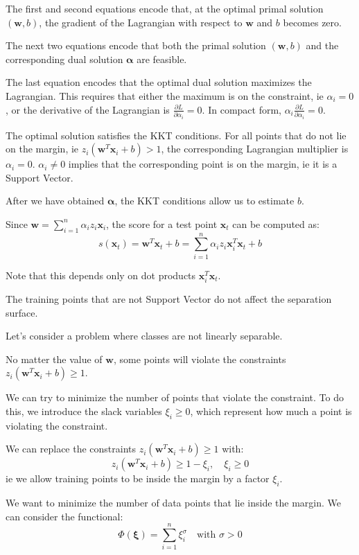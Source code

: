 The first and second equations encode that, at the optimal primal solution $(\mathbf{w}, b)$, the
gradient of the Lagrangian with respect to $\mathbf{w}$ and $b$ becomes zero.

The next two equations encode that both the primal solution $(\mathbf{w}, b)$ and the corresponding
dual solution $\boldsymbol{\alpha}$ are feasible.

The last equation encodes that the optimal dual solution maximizes the Lagrangian. This
requires that either the maximum is on the constraint, ie $\alpha_i = 0$, or the derivative of the
Lagrangian is $\frac{\partial L}{\partial \alpha_i} = 0$. In compact form, $\alpha_i \frac{\partial L}{\partial \alpha_i} = 0$.

The optimal solution satisfies the KKT conditions. For all points that do not lie on the
margin, ie $z_i(\mathbf{w}^T \mathbf{x}_i + b) > 1$, the corresponding Lagrangian multiplier is $\alpha_i = 0$.
$\alpha_i \neq 0$ implies that the corresponding point is on the margin, ie it is a Support Vector.

After we have obtained $\boldsymbol{\alpha}$, the KKT conditions allow us to estimate $b$.

Since $\mathbf{w} = \sum_{i=1}^n \alpha_i z_i \mathbf{x}_i$, the score for a test point $\mathbf{x}_t$ can be computed as:
\[
s(\mathbf{x}_t) = \mathbf{w}^T \mathbf{x}_t + b = \sum_{i=1}^n \alpha_i z_i \mathbf{x}_i^T \mathbf{x}_t + b
\]

Note that this depends only on dot products $\mathbf{x}_i^T \mathbf{x}_t$.

The training points that are not Support Vector do not affect the separation surface.

Let's consider a problem where classes are not linearly separable.

No matter the value of $\mathbf{w}$, some points will violate the constraints $z_i(\mathbf{w}^T \mathbf{x}_i + b) \geq 1$.

We can try to minimize the number of points that violate the constraint. To do this, we
introduce the slack variables $\xi_i \geq 0$, which represent how much a point is violating the
constraint.

We can replace the constraints $z_i(\mathbf{w}^T \mathbf{x}_i + b) \geq 1$ with:
\[
z_i(\mathbf{w}^T \mathbf{x}_i + b) \geq 1 - \xi_i, \quad \xi_i \geq 0
\]
ie we allow training points to be inside the margin by a factor $\xi_i$.

We want to minimize the number of data points that lie inside the margin. We can consider
the functional:
\[
\Phi(\boldsymbol{\xi}) = \sum_{i=1}^n \xi_i^\sigma \quad \text{with } \sigma > 0
\]


